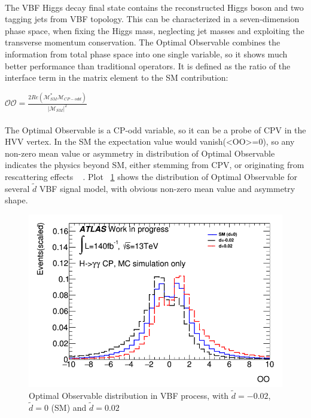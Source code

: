 \paragraph{}The VBF Higgs decay final state contains the reconstructed Higgs boson and two tagging jets from VBF topology. This can be characterized in a seven-dimension phase space, when fixing the Higgs mass, neglecting jet masses and exploiting the transverse momentum conservation. The Optimal Observable combines the information from total phase space into one single variable, so it shows much better performance than traditional operators. It is defined as the ratio of the interface term in the matrix element to the SM contribution: 

\begin{center}
\begin{math}
\mathcal{OO} = \frac{2Re(\mathcal{M}^{\ast}_{SM} \mathcal{M}_{CP-odd})}{|\mathcal{M}_{SM}|^2}
\end{math}
\end{center}


\paragraph{}The Optimal Observable is a CP-odd variable, so it can be a probe of CPV in the HVV vertex. In the SM the expectation value would vanish(<OO>=0), so any non-zero mean value or asymmetry in distribution of Optimal Observable indicates the physics beyond SM, either stemming from CPV, or originating from rescattering effects ~\cite{Brehmer_2018} . Plot ~\ref{fig:OOwithd} shows the distribution of Optimal Observable for several $\tilde{d}$ VBF signal model, with obvious non-zero mean value and asymmetry shape. 

\begin{figure}[h]
	\centering
	\includegraphics[width=.7\textwidth]{figure/OOind.png}
	\caption{Optimal Observable distribution in VBF process, with $\tilde{d}=-0.02$, $\tilde{d}=0$ (SM) and $\tilde{d}=0.02$}
	\label{fig:OOwithd}
\end{figure}

